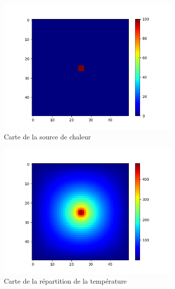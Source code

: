 \documentclass{article}
\begin{document}
\begin{figure}[ht]
  \centering
  \begin{subfigure}{0.3\textwidth}
    \centering
    \includegraphics[width=\linewidth]{Chaleur_1.png}
    \caption{Carte de la source de chaleur}
    \label{subfig:central_source_prev}
  \end{subfigure}
  \hfill
  \begin{subfigure}{0.3\textwidth}
    \centering
    \includegraphics[width=\linewidth]{Chaleur_1b.png}
    \caption{Carte de la répartition de la température}
    \label{subfig:central_source_temp}
  \end{subfigure}
  \hfill
  \begin{subfigure}{0.3\textwidth}

\end{subfigure}
\end{figure}
\end{document}

